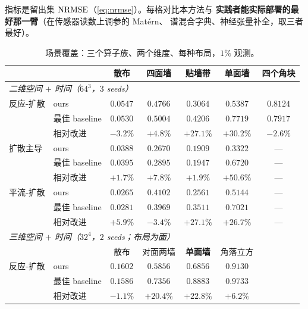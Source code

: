 \documentclass[11pt,a4paper]{article}
\begin{document}
指标是留出集 $\mathrm{NRMSE}$（\cref{eq:nrmse}）。每格对比本方法与
\textbf{实践者能实际部署的最好那一臂}（在传感器读数上调参的 Matérn、
谱混合字典、神经张量补全，取三者最好）。

\begin{table}[t]
\centering
\caption{场景覆盖：三个算子族、两个维度、每种布局，$1\%$ 观测。}
\label{tab:coverage}
\small
\begin{tabular}{llccccc}
\toprule
 & & 散布 & 四面墙 & 贴墙带 & \textbf{单面墙} & 四个角块 \\
\midrule
\multicolumn{7}{l}{\emph{二维空间 $+$ 时间（$64^3$，$3$ seeds）}} \\
反应-扩散 & ours & $0.0547$ & $\mathbf{0.4766}$ & $\mathbf{0.3064}$ & $\mathbf{0.5387}$ & $0.8124$ \\
          & 最佳 baseline & $0.0530$ & $0.5004$ & $0.4206$ & $0.7719$ & $0.7917$ \\
          & 相对改进 & $-3.2\%$ & $+4.8\%$ & $\mathbf{+27.1\%}$ & $\mathbf{+30.2\%}$ & $-2.6\%$ \\
\addlinespace
扩散主导 & ours & $\mathbf{0.0388}$ & $\mathbf{0.2670}$ & $\mathbf{0.1909}$ & $\mathbf{0.3322}$ & --- \\
          & 最佳 baseline & $0.0395$ & $0.2895$ & $0.1947$ & $0.6720$ & --- \\
          & 相对改进 & $+1.7\%$ & $+7.8\%$ & $+1.9\%$ & $\mathbf{+50.6\%}$ & --- \\
\addlinespace
平流-扩散 & ours & $\mathbf{0.0265}$ & $0.4102$ & $\mathbf{0.2561}$ & $\mathbf{0.5144}$ & --- \\
          & 最佳 baseline & $0.0281$ & $0.3969$ & $0.3511$ & $0.7021$ & --- \\
          & 相对改进 & $+5.9\%$ & $-3.4\%$ & $\mathbf{+27.1\%}$ & $\mathbf{+26.7\%}$ & --- \\
\midrule
\multicolumn{7}{l}{\emph{三维空间 $+$ 时间（$32^4$，$2$ seeds；布局为面）}} \\
 & & 散布 & 对面两墙 & \textbf{单面墙} & 角落立方 & \\
反应-扩散 & ours & $0.1602$ & $\mathbf{0.5856}$ & $\mathbf{0.6856}$ & $\mathbf{0.9130}$ & \\
          & 最佳 baseline & $0.1586$ & $0.7356$ & $0.8883$ & $0.9733$ & \\
          & 相对改进 & $-1.1\%$ & $\mathbf{+20.4\%}$ & $\mathbf{+22.8\%}$ & $+6.2\%$ & \\
\bottomrule
\end{tabular}
\end{table}
\end{document}
